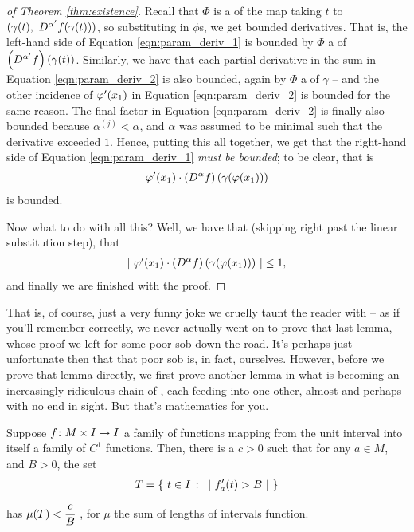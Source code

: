 \begin{proof}[of Theorem \ref{thm:existence}]
    Recall that $\Phi$ is a \cellrparam of the map taking $t$ to $(\gamma(t), \ D^{\alpha^{\prime}} f(\gamma(t)))$, so substituting in $\phi$s, we get bounded derivatives. That is, the left-hand side of Equation \ref{eqn:param_deriv_1} is bounded by $\Phi$ a \cellrparam of $\left( D^{\alpha^{\prime}} f \right)(\gamma(t))$. Similarly, we have that each partial derivative in the sum in Equation \ref{eqn:param_deriv_2} is also bounded, again by $\Phi$ a \cellrparam of $\gamma$ -- and the other incidence of $\varphi^{\prime}(x_1)$ in Equation \ref{eqn:param_deriv_2} is bounded for the same reason. The final factor in Equation \ref{eqn:param_deriv_2} is finally also bounded because $\alpha^{(j)} < \alpha$, and $\alpha$ was assumed to be minimal such that the derivative exceeded $1$. Hence, putting this all together, we get that the right-hand side of Equation \ref{eqn:param_deriv_1} \emph{must be bounded}; to be clear, that is
      \begin{align*}
        \varphi^{\prime}(x_1) \cdot \left( D^{\alpha} f \right) \left( \gamma (\varphi(x_1)) \right)
      \end{align*}
    is bounded.

    Now what to do with all this? Well, we have that (skipping right past the linear substitution step), that
      \begin{align*}
        \left\vert \  \varphi^{\prime}(x_1) \cdot \left( D^{\alpha} f \right) \left( \gamma (\varphi(x_1)) \right)  \ \right\vert \leq 1,
      \end{align*}
      and finally we are finished with the proof.
    \end{proof}


That is, of course, just a very funny joke we cruelly taunt the reader with -- as if you'll remember correctly, we never actually went on to prove that last lemma, whose proof we left for some poor sob down the road. It's perhaps just unfortunate then that that poor sob is, in fact, ourselves. However, before we prove that lemma directly, we first prove another lemma in what is becoming an increasingly ridiculous chain of \lemmas, each feeding into one other, almost and perhaps with no end in sight. But that's mathematics for you.

\begin{lemma}
  Suppose $f \colon M \times I \to I$ a family of functions mapping from the unit interval into itself a  family of $C^1$ functions. Then, there is a $c > 0$ such that for any $a \in M$, and $B > 0$, the set
    \begin{align*}
      T = \left\{ \ t \in I \ \colon \ \lvrv{ \pri{f_a}(t) > B } \ \right\}
    \end{align*}
    has $\mu(T) < \cfrac{c}{B} \ $, for $\mu$ the sum of lengths of intervals function.
    \label{lem:small_lemma_in_support}
  \end{lemma}

